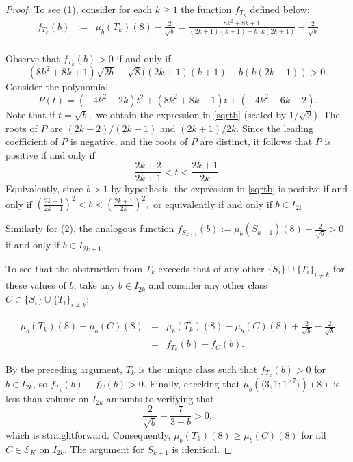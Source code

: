 \documentclass[10pt,a4paper]{amsart}
\newcommand\be{\begin{equation*}}
\newcommand\ee{\end{equation*}}
\begin{document}
\begin{proof}
To see (1), consider for each $k \ge 1$ the function $f_{T_k}$ defined below:
\begin{eqnarray*}
f_{T_k}(b) & := & \mu_b(T_k)(8)-\frac{2}{\sqrt{b}} = \frac{8k^2+8k+1}{(2k+1)(k+1) + b\cdot k(2k+1)} - \frac{2}{\sqrt{b}} \\
\end{eqnarray*}

Observe that $f_{T_k}(b) > 0$ if and only if \begin{equation}\label{sqrtb}
(8k^2 + 8k +1)\sqrt{2b} - \sqrt{8}((2k+1)(k + 1) + b(k(2k+1)) > 0.
\end{equation} Consider the polynomial \be P(t) = (-4k^2-2k)t^2 + (8k^2+8k+1)t + (-4k^2-6k-2).\ee Note that if $t = \sqrt{b},$ we obtain the expression in \ref{sqrtb} (scaled by $1/\sqrt{2}$). The roots of $P$ are $(2k+2)/(2k+1)$ and $(2k+1)/2k.$ Since the leading coefficient of $P$ is negative, and the roots of $P$ are distinct, it follows that $P$ is positive if and only if \be\frac{2k+2}{2k+1} < t < \frac{2k+1}{2k}.\ee Equivalently, since $b>1$ by hypothesis, the expression in \ref{sqrtb} is positive if and only if $\left(\frac{2k+1}{2k+1}\right)^2 < b < \left(\frac{2k+1}{2k}\right)^2,$ or equivalently if and only if $b \in I_{2k}.$

Similarly for (2), the analogous function $f_{S_{k+1}}(b):= \mu_b(S_{k+1})(8)-\frac{2}{\sqrt{b}}>0$ if and only if $b \in I_{2k+1}.$

To see that the obstruction from $T_k$ exceeds that of any other $\{S_i\}\cup \{T_i\}_{i\neq k}$ for these values of $b$, take any $b\in I_{2k}$ and consider any other class $C\in\{S_i\}\cup \{T_i\}_{i\neq k}$:

\begin{eqnarray*}
\mu_b(T_k)(8) - \mu_b(C)(8) & = &  \mu_b(T_k)(8) - \mu_b(C)(8) + \frac{2}{\sqrt{b}} - \frac{2}{\sqrt{b}} \\
& = & f_{T_k}(b) - f_C(b).
\end{eqnarray*}

By the preceding argument, $T_k$ is the unique class such that $f_{T_k}(b)>0$ for $b\in I_{2k}$, so $f_{T_k}(b) - f_C(b) > 0.$ Finally, checking that $\mu_b(\langle 3, 1; 1^{\times 7}\rangle)(8)$ is less than volume on $I_{2k}$ amounts to verifying that \be\frac{2}{\sqrt{b}} - \frac{7}{3+b} > 0,\ee which is straightforward. Consequently, $\mu_b(T_k)(8) \ge \mu_b(C)(8)$ for all $C \in \mathcal{E}_K$ on $I_{2k}.$ The argument for $S_{k+1}$ is identical.
\end{proof}
\end{document}
